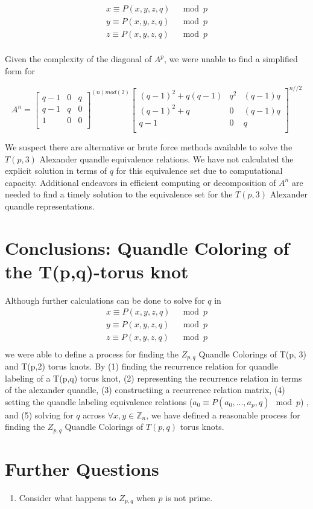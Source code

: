 \documentclass[paper.tex]{subfiles}
\begin{document}
\begin{align*}
	x \equiv P(x,y,z,q) & \mod{p} \\
	y \equiv P(x,y,z,q) & \mod{p} \\
	z \equiv P(x,y,z,q) & \mod{p} \\
\end{align*}

Given the complexity of the diagonal of $A^{p}$, we were unable to find a simplified form for 

\[ A^{n}
=
\left[ \begin{array}{ccc}
q-1 & 0 & q \\
q-1 & q & 0 \\
1 & 0 & 0 \\
\end{array} \right] ^{(n)mod(2)}
\left[ \begin{array}{ccc}
(q-1)^{2} + q(q-1) & q^{2} & (q-1)q \\
(q-1)^{2} + q & 0 & (q-1)q \\
q-1 & 0 & q \\
\end{array} \right] ^{n//2} 
\]

We suspect there are alternative or brute force methods available to solve the $T(p,3)$ Alexander quandle equivalence relations.  We have not calculated the explicit solution in terms of $q$ for this equivalence set due to computational capacity. Additional endeavors in efficient computing or decomposition of $A^{n}$ are needed to find a timely solution to the equivalence set for the $T(p,3)$ Alexander quandle representations. 


\section{Conclusions: Quandle Coloring of the T(p,q)-torus knot}\label{sec:2ntorus}
Although further calculations can be done to solve for $q$ in 
\begin{align*}
	x \equiv P(x,y,z,q) & \mod{p} \\
	y \equiv P(x,y,z,q) & \mod{p} \\
	z \equiv P(x,y,z,q) & \mod{p} \\
\end{align*}
we were able to define a process for finding the $Z_{p,q}$ Quandle Colorings of T(p, 3) and T(p,2) torus knots. By (1) finding the recurrence relation for quandle labeling of a T(p,q) torus knot, (2) representing the recurrence relation in terms of the alexander quandle, (3) constructiing a recurrence relation matrix,  (4) setting the quandle labeling equivalence relations ($a_{0} \equiv P(a_{0},...,a_{p},q) \mod{p}$) , and (5) solving for $q$ across $\forall x,y \in \mathbb{Z}_n$, we have defined a reasonable process for finding the $Z_{p,q}$ Quandle Colorings of $T(p,q)$ torus knots. 

\section{Further Questions}\label{fqs}

\begin{enumerate}
	\item Consider what happens to $Z_{p,q}$ when $p$ is not prime.
\end{enumerate}



\end{document}
